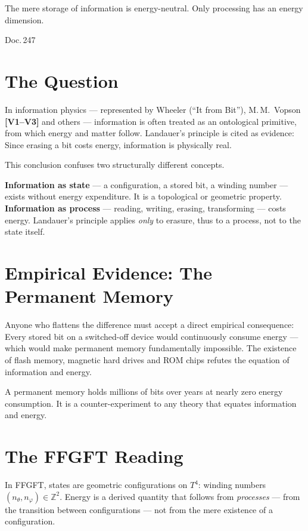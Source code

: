 \label{ch:zustand_prozess}

\epigraph{The mere storage of information is energy-neutral.
Only processing has an energy dimension.}{Doc.\,247}

\section{The Question}

In information physics --- represented by Wheeler (``It from Bit''),
M.\,M.~Vopson \textbf{[V1--V3]} and others --- information is often treated as an ontological
primitive, from which energy and matter follow. Landauer's principle is
cited as evidence: Since erasing a bit costs energy,
information is physically real.

This conclusion confuses two structurally different concepts.

\begin{keyresult}
\textbf{Information as state} --- a configuration, a stored bit,
a winding number --- exists without energy expenditure. It is a topological
or geometric property.\\[4pt]
\textbf{Information as process} --- reading, writing, erasing, transforming
--- costs energy. Landauer's principle applies \emph{only} to erasure, thus
to a process, not to the state itself.
\end{keyresult}

\section{Empirical Evidence: The Permanent Memory}

Anyone who flattens the difference must accept a direct empirical consequence:
Every stored bit on a switched-off device would
continuously consume energy --- which would make permanent memory fundamentally
impossible. The existence of flash memory, magnetic hard drives
and ROM chips refutes the equation of information and energy.

A permanent memory holds millions of bits over years at nearly zero
energy consumption. It is a counter-experiment to any theory that equates information
and energy.

\section{The FFGFT Reading}

In FFGFT, states are geometric configurations on $T^4$:
winding numbers $(n_\theta, n_\varphi) \in \mathbb{Z}^2$. Energy is a
derived quantity that follows from \emph{processes} --- from the transition between
configurations --- not from the mere existence of a configuration.

